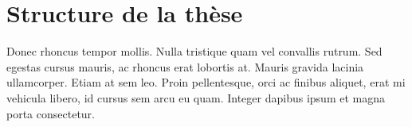 \section{Structure de la thèse}
Donec rhoncus tempor mollis. Nulla tristique quam vel convallis rutrum. Sed egestas cursus mauris, ac rhoncus erat lobortis at. Mauris gravida lacinia ullamcorper. Etiam at sem leo. Proin pellentesque, orci ac finibus aliquet, erat mi vehicula libero, id cursus sem arcu eu quam. Integer dapibus ipsum et magna porta consectetur.
